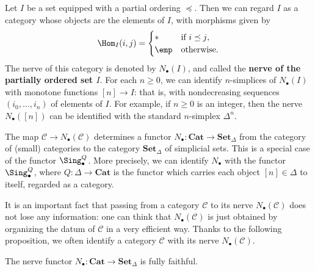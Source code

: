 \begin{example}
Let $I$ be a set equipped with a partial ordering $\preceq$. Then we can regard $I$ as a category whose objects are the elements of $I$, with morphisms given by
\[\Hom_I(i,j)=\begin{cases}
\ast&\text{if $i\preceq j$},\\
\emp&\text{otherwise}.
\end{cases}\]
The nerve of this category is denoted by $N_\bullet(I)$, and called the \textbf{nerve of the partially ordered set $I$}. For each $n\geq 0$, we can identify $n$-simplices of $N_\bullet(I)$ with monotone functions $[n]\to I$: that is, with nondecreasing sequences $(i_0,\dots,i_n)$ of elements of $I$. For example, if $n\geq 0$ is an integer, then the nerve $N_\bullet([n])$ can be identified with the standard $n$-simplex $\Delta^n$.
\end{example}
\begin{remark}\label{simplicial set nerve of cat is Sing^Q}
The map $\mathcal{C}\to N_\bullet(\mathcal{C})$ determines a functor $N_\bullet:\mathbf{Cat}\to\mathbf{Set}_\Delta$ from the category of (small) categories to the category $\mathbf{Set}_\Delta$ of simplicial sets. This is a special case of the functor $\Sing_\bullet^Q$. More precisely, we can identify $N_\bullet$ with the functor $\Sing_\bullet^Q$, where $Q:\Delta\to\mathbf{Cat}$ is the functor which carries each object $[n]\in\Delta$ to itself, regarded as a category.
\end{remark}
It is an important fact that passing from a category $\mathcal{C}$ to its nerve $N_\bullet(\mathcal{C})$ does not lose any information: one can think that $N_\bullet(\mathcal{C})$ is just obtained by organizing the datum of $\mathcal{C}$ in a very efficient way. Thanks to the following proposition, we often identify a category $\mathcal{C}$ with its nerve $N_\bullet(\mathcal{C})$.
\begin{proposition}\label{simplicial set nerve of cat fully faithful}
The nerve functor $N_\bullet:\mathbf{Cat}\to\mathbf{Set}_\Delta$ is fully faithful.
\end{proposition}
